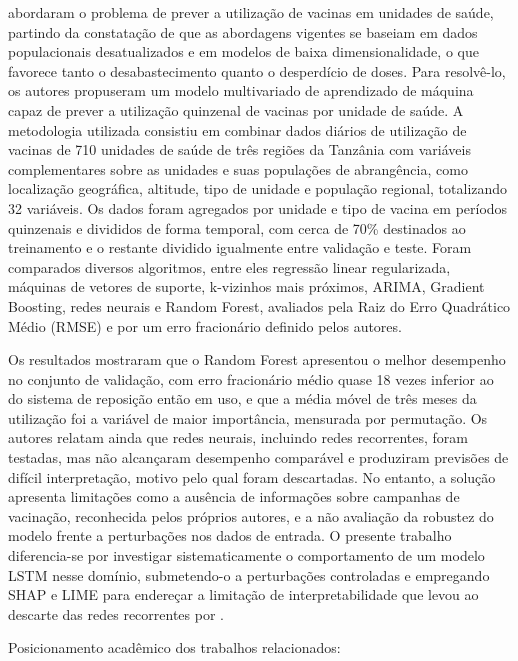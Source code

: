 \documentclass[
    12pt,                %
    openright,           %
    oneside,             %
    a4paper,             %
    english,             %
    brazil               %
]{abntex2}
\begin{document}
 abordaram o problema de prever a utilização de vacinas em unidades de saúde, partindo da constatação de que as abordagens vigentes se baseiam em dados populacionais desatualizados e em modelos de baixa dimensionalidade, o que favorece tanto o desabastecimento quanto o desperdício de doses. Para resolvê-lo, os autores propuseram um modelo multivariado de aprendizado de máquina capaz de prever a utilização quinzenal de vacinas por unidade de saúde. A metodologia utilizada consistiu em combinar dados diários de utilização de vacinas de 710 unidades de saúde de três regiões da Tanzânia com variáveis complementares sobre as unidades e suas populações de abrangência, como localização geográfica, altitude, tipo de unidade e população regional, totalizando 32 variáveis. Os dados foram agregados por unidade e tipo de vacina em períodos quinzenais e divididos de forma temporal, com cerca de 70\% destinados ao treinamento e o restante dividido igualmente entre validação e teste. Foram comparados diversos algoritmos, entre eles regressão linear regularizada, máquinas de vetores de suporte, k-vizinhos mais próximos, ARIMA, Gradient Boosting, redes neurais e Random Forest, avaliados pela Raiz do Erro Quadrático Médio (RMSE) e por um erro fracionário definido pelos autores.

Os resultados mostraram que o Random Forest apresentou o melhor desempenho no conjunto de validação, com erro fracionário médio quase 18 vezes inferior ao do sistema de reposição então em uso, e que a média móvel de três meses da utilização foi a variável de maior importância, mensurada por permutação. Os autores relatam ainda que redes neurais, incluindo redes recorrentes, foram testadas, mas não alcançaram desempenho comparável e produziram previsões de difícil interpretação, motivo pelo qual foram descartadas. No entanto, a solução apresenta limitações como a ausência de informações sobre campanhas de vacinação, reconhecida pelos próprios autores, e a não avaliação da robustez do modelo frente a perturbações nos dados de entrada. O presente trabalho diferencia-se por investigar sistematicamente o comportamento de um modelo LSTM nesse domínio, submetendo-o a perturbações controladas e empregando SHAP e LIME para endereçar a limitação de interpretabilidade que levou ao descarte das redes recorrentes por .

\vspace{0.3cm}
Posicionamento acadêmico dos trabalhos relacionados:
\end{document}
